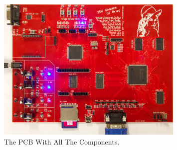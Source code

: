 \begin{figure}[h]
  \centering
  \includegraphics[width=0.8\textwidth]{fig/pcb/pcbwithcomp.jpg}
  \caption[The PCB]{The PCB With All The Components.}
  \label{fig:pcb-with-components}
\end{figure}
